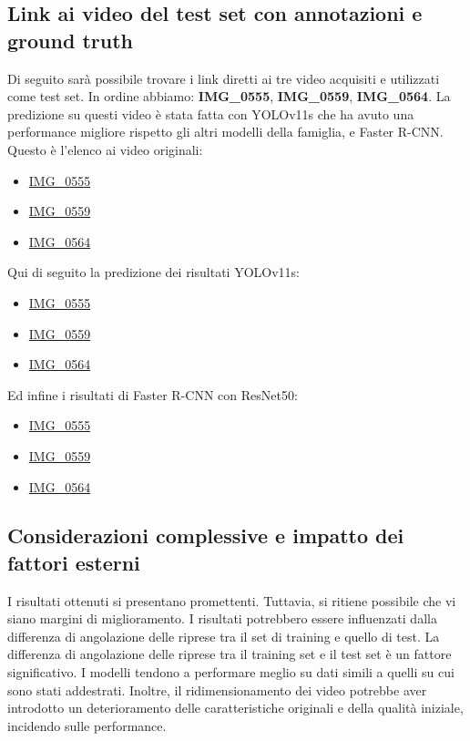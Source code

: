\documentclass[12pt]{article}
\begin{document}
\subsection{Link ai video del test set con annotazioni e ground truth}
Di seguito sarà possibile trovare i link diretti ai tre video acquisiti e utilizzati come test set. In ordine abbiamo: \textbf{IMG\_0555}, \textbf{IMG\_0559}, \textbf{IMG\_0564}. La predizione su questi video è stata fatta con YOLOv11s che ha avuto una performance migliore rispetto gli altri modelli della famiglia, e Faster R-CNN.\\
Questo è l'elenco ai video originali:
\begin{itemize}
    \item \href{https://drive.google.com/file/d/1z2SZrV0Oo12ZmZHmEnvc6FI6S2xBEjoE/view}{IMG\_0555}
    \item \href{https://drive.google.com/file/d/1FsokvyyQTtCPPU-ZIuCIpo1K5gemVwOx/view}{IMG\_0559}
    \item \href{https://drive.google.com/file/d/1L-C9DcVM4l_B8eLbezqnkduJdwJBZnd3/view}{IMG\_0564}
\end{itemize}
Qui di seguito la predizione dei risultati YOLOv11s:
\begin{itemize}
    \item \href{https://drive.google.com/file/d/1d7B1pMO5ctPi2unE_4nkdvajYZBqxDTj/view}{IMG\_0555}
    \item \href{https://drive.google.com/file/d/1D5YNEHx2KaIldo9vBqM_gRzD07-hArh5/view}{IMG\_0559}
    \item \href{https://drive.google.com/file/d/1njPmy47J4beGyqhlNW3y3yMPaNR4EntA/view}{IMG\_0564}
\end{itemize}
Ed infine i risultati di Faster R-CNN con ResNet50:
\begin{itemize}
    \item \href{https://drive.google.com/file/d/1xUAzZqYaYcdar1p-CkyW6TPmXwx6kMgs/view}{IMG\_0555}
    \item \href{https://drive.google.com/file/d/1dW8WLCrrsxh71S9F2NQbzeKWljWRUzQn/view}{IMG\_0559}
    \item \href{https://drive.google.com/file/d/1XUTXkQL84rpisBOrjzlyYpyvCGkHcwg2/view}{IMG\_0564}
\end{itemize}

\subsection{Considerazioni complessive e impatto dei fattori esterni}
I risultati ottenuti si presentano promettenti. Tuttavia, si ritiene possibile che vi siano margini di miglioramento. I risultati potrebbero essere influenzati dalla differenza di angolazione delle riprese tra il set di training e quello di test. La differenza di angolazione delle riprese tra il training set e il test set è un fattore significativo. I modelli tendono a performare meglio su dati simili a quelli su cui sono stati addestrati. Inoltre, il ridimensionamento dei video potrebbe aver introdotto un deterioramento delle caratteristiche originali e della qualità iniziale, incidendo sulle performance.
\end{document}
